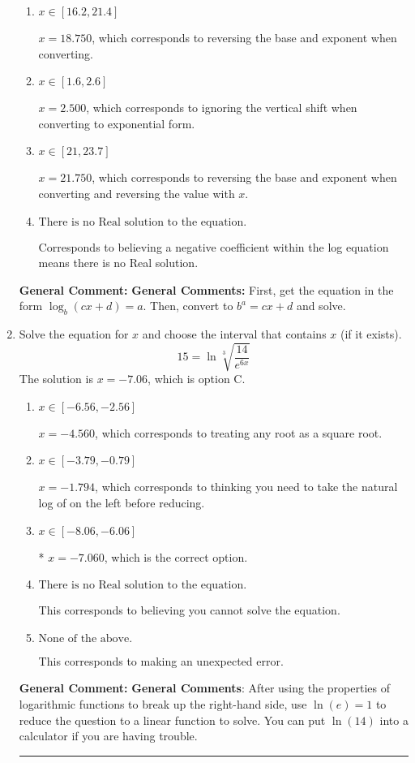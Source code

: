 \documentclass{extbook}[14pt]
\newcommand{\litem}[1]{\item #1

\rule{\textwidth}{0.4pt}}
\begin{document}
\begin{enumerate}
{\begin{enumerate}[label=\Alph*.]
* $x = -1.496$, which is the correct option.
\item \( x \in [16.2, 21.4] \)

$x = 18.750$, which corresponds to reversing the base and exponent when converting.
\item \( x \in [1.6, 2.6] \)

$x = 2.500$, which corresponds to ignoring the vertical shift when converting to exponential form.
\item \( x \in [21, 23.7] \)

$x = 21.750$, which corresponds to reversing the base and exponent when converting and reversing the value with $x$.
\item \( \text{There is no Real solution to the equation.} \)

Corresponds to believing a negative coefficient within the log equation means there is no Real solution.
\end{enumerate}

\textbf{General Comment:} \textbf{General Comments:} First, get the equation in the form $\log_b{(cx+d)} = a$. Then, convert to $b^a = cx+d$ and solve.
}
\litem{
 Solve the equation for $x$ and choose the interval that contains $x$ (if it exists).
\[  15 = \ln{\sqrt[3]{\frac{14}{e^{6x}}}} \]The solution is \( x = -7.06 \), which is option C.\begin{enumerate}[label=\Alph*.]
\item \( x \in [-6.56, -2.56] \)

$x = -4.560$, which corresponds to treating any root as a square root.
\item \( x \in [-3.79, -0.79] \)

$x = -1.794$, which corresponds to thinking you need to take the natural log of on the left before reducing.
\item \( x \in [-8.06, -6.06] \)

* $x = -7.060$, which is the correct option.
\item \( \text{There is no Real solution to the equation.} \)

This corresponds to believing you cannot solve the equation.
\item \( \text{None of the above.} \)

This corresponds to making an unexpected error.
\end{enumerate}

\textbf{General Comment:} \textbf{General Comments}: After using the properties of logarithmic functions to break up the right-hand side, use $\ln(e) = 1$ to reduce the question to a linear function to solve. You can put $\ln(14)$ into a calculator if you are having trouble.
}
\end{enumerate}
\end{document}
